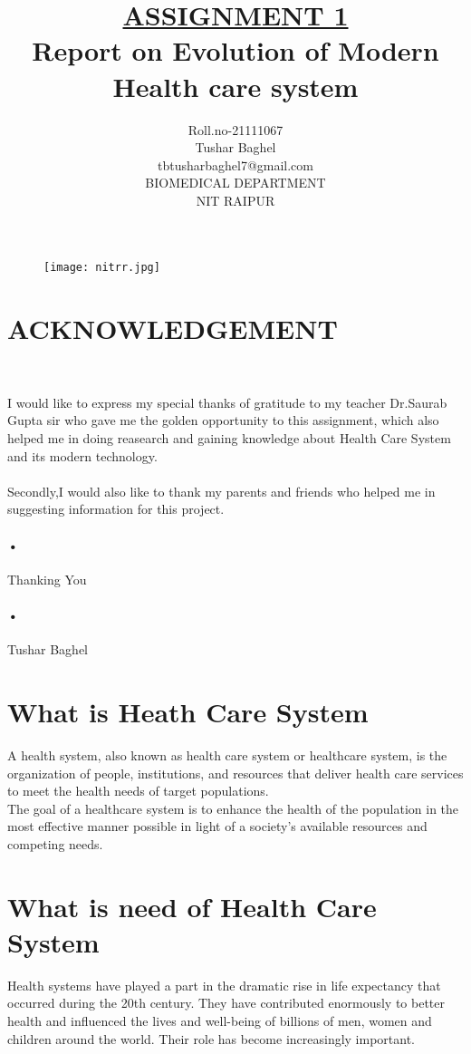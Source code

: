 \documentclass[12pt]{report}
\title{\underline{ASSIGNMENT 1} \\
Report on Evolution of Modern Health care system }
\author{Roll.no-21111067\\Tushar Baghel\\tbtusharbaghel7@gmail.com\\BIOMEDICAL DEPARTMENT\\NIT RAIPUR\\}
\begin{document}
\begin{figure}
\centering
\texttt{[image: nitrr.jpg]}
\end{figure}
\maketitle
\clearpage
\tableofcontents
\clearpage

\section{ACKNOWLEDGEMENT}\


I would like to express my special thanks of gratitude to my teacher Dr.Saurab Gupta sir who gave me the golden opportunity to this assignment, which also helped me in doing reasearch and gaining knowledge about Health Care System and its modern technology.\paragraph{}

Secondly,I would also like to thank my parents and friends who helped me in suggesting information for this project.\paragraph{•}


Thanking You\paragraph{•}

Tushar Baghel 

\clearpage


\section{What is Heath Care System}

A health system, also known as health care system or healthcare system, is the organization of people, institutions, and resources that deliver health care services to meet the health needs of target populations.\\
The goal of a healthcare system is to enhance the health of the population in the most effective manner possible in light of a society's available resources and competing needs.

\section{What is need of Health Care System}
Health systems have played a part in the dramatic rise in life expectancy that occurred during the 20th century. They have contributed enormously to better health and influenced the lives and well-being of billions of men, women and children around the world. Their role has become increasingly important.\\
\end{document}
